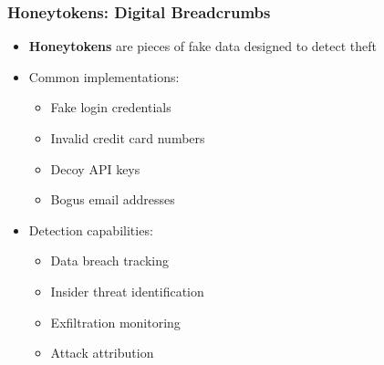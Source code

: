 \documentclass{beamer}
\begin{document}
\begin{frame}
    \frametitle{Honeytokens: Digital Breadcrumbs}
    \begin{itemize}
        \item \textbf{Honeytokens} are pieces of fake data designed to detect theft
        \item Common implementations:
          \begin{itemize}
            \item Fake login credentials
            \item Invalid credit card numbers
            \item Decoy API keys
            \item Bogus email addresses
          \end{itemize}
        \item Detection capabilities:
          \begin{itemize}
            \item Data breach tracking
            \item Insider threat identification
            \item Exfiltration monitoring
            \item Attack attribution
          \end{itemize}
    \end{itemize}
\end{frame}
\end{document}
